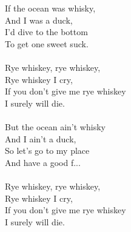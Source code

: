 
            If the ocean was whisky, \\
            And I was a duck, \\
            I’d dive to the bottom \\
            To get one sweet suck. \\
\hspace{10mm} \\
            Rye whiskey, rye whiskey, \\
            Rye whiskey I cry, \\
            If you don't give me rye whiskey \\
            I surely will die. \\
\hspace{10mm} \\
            But the ocean ain’t whisky \\
            And I ain’t a duck, \\
            So let’s go to my place \\
            And have a good f... \\
\hspace{10mm} \\
            Rye whiskey, rye whiskey, \\
            Rye whiskey I cry, \\
            If you don't give me rye whiskey \\
            I surely will die. \\

